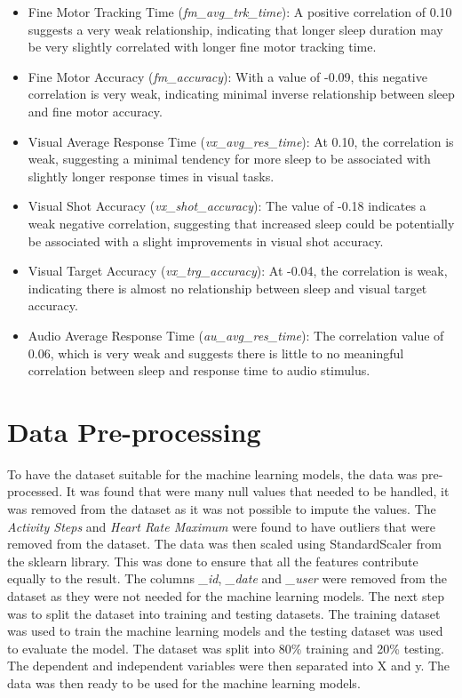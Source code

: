 \begin{itemize}
    \item Fine Motor Tracking Time (\textit{fm\_avg\_trk\_time}): A positive correlation of 0.10 suggests a very weak relationship, indicating that longer sleep duration
    may be very slightly correlated with longer fine motor tracking time. 
        
    \item Fine Motor Accuracy (\textit{fm\_accuracy}): With a value of -0.09, this negative correlation is very weak, indicating minimal inverse relationship between sleep
    and fine motor accuracy.
    
    \item Visual Average Response Time (\textit{vx\_avg\_res\_time}): At 0.10, the correlation is weak, suggesting a minimal tendency for more sleep to be associated with slightly
    longer response times in visual tasks.
    
    \item Visual Shot Accuracy (\textit{vx\_shot\_accuracy}): The value of -0.18 indicates a weak negative correlation, suggesting that increased sleep could be potentially be associated
    with a slight improvements in visual shot accuracy. 

    \item Visual Target Accuracy (\textit{vx\_trg\_accuracy}): At -0.04, the correlation is weak, indicating there is almost no relationship between sleep and visual target accuracy.
    
    \item Audio Average Response Time (\textit{au\_avg\_res\_time}): The correlation value of 0.06, which is very weak and suggests there is little to no meaningful correlation between
    sleep and response time to audio stimulus.
    
\end{itemize}


\section{Data Pre-processing}
To have the dataset suitable for the machine learning models, the data was pre-processed. It was found that were many null values that needed to be handled, 
it was removed from the dataset as it was not possible to impute the values. The \textit{Activity Steps} and \textit{Heart Rate Maximum} were found to have
outliers that were removed from the dataset. The data was then scaled using StandardScaler from the sklearn library. This was done to ensure that all the features
contribute equally to the result. The columns \textit{\_id}, \textit{\_date} and \textit{\_user} were removed from the dataset as they were not needed for the machine learning models.
The next step was to split the dataset into training and testing datasets. The training dataset was used to train the machine learning models and the testing dataset was used to evaluate
the model. The dataset was split into 80\% training and 20\% testing. The dependent and independent variables were then separated into X and y. The data was then ready to be used for the machine learning models.


